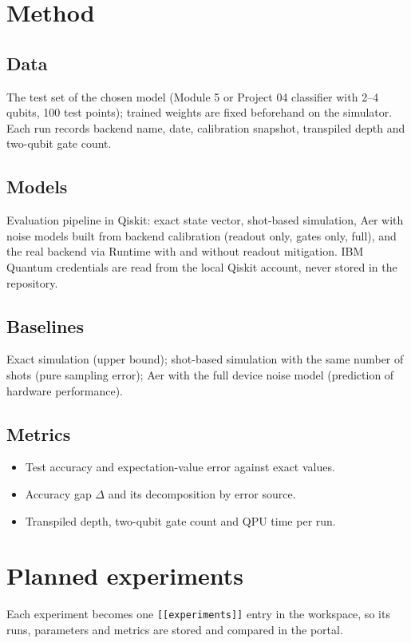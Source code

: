 \documentclass[11pt,a4paper]{article}
\begin{document}
\section{Method}
\subsection{Data}
The test set of the chosen model (Module 5 or Project 04 classifier with 2--4 qubits, 100 test points);
trained weights are fixed beforehand on the simulator. Each run records backend name, date, calibration
snapshot, transpiled depth and two-qubit gate count.

\subsection{Models}
Evaluation pipeline in Qiskit: exact state vector, shot-based simulation, Aer with noise models built from
backend calibration (readout only, gates only, full), and the real backend via Runtime with and without
readout mitigation. IBM Quantum credentials are read from the local Qiskit account, never stored in the
repository.

\subsection{Baselines}
Exact simulation (upper bound); shot-based simulation with the same number of shots (pure sampling
error); Aer with the full device noise model (prediction of hardware performance).

\subsection{Metrics}
\begin{itemize}
  \item Test accuracy and expectation-value error against exact values.
  \item Accuracy gap $\Delta$ and its decomposition by error source.
  \item Transpiled depth, two-qubit gate count and QPU time per run.
\end{itemize}

\section{Planned experiments}
Each experiment becomes one \texttt{[[experiments]]} entry in the workspace, so its runs, parameters
and metrics are stored and compared in the portal.
\end{document}
